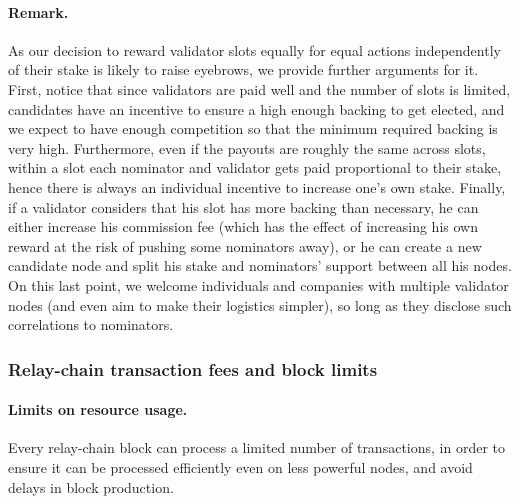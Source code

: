 \paragraph{Remark.} As our decision to reward validator slots equally for equal actions independently of their stake 
is likely to raise eyebrows, we provide further arguments for it. 
First, notice that since validators are paid well and the number of slots is limited, 
 candidates have an incentive to ensure a high enough backing to get elected, 
and we expect to have enough competition so that the minimum required backing is very high. 
Furthermore, even if the payouts are roughly the same across slots, within a slot each nominator and validator 
gets paid proportional to their stake, hence there is always an individual incentive to increase one's own stake. 
Finally, if a validator considers that his slot has more backing than necessary, he can either increase his 
commission fee (which has the effect of increasing his own reward at the risk of pushing some nominators away),
or he can create a new candidate node and split his stake and nominators' support between all his nodes. 
On this last point, we welcome individuals and companies with multiple validator nodes (and even aim to make their 
logistics simpler), so long as they disclose such correlations to nominators.


\subsubsection{Relay-chain transaction fees and block limits}

\paragraph{Limits on resource usage.} Every relay-chain block can process a limited number of transactions, in order to ensure it can be processed efficiently even on less powerful nodes, 
and avoid delays in block production. 






